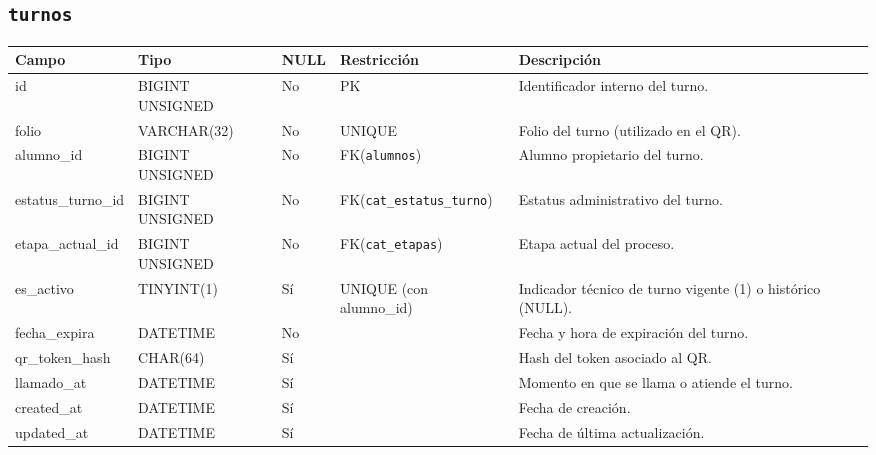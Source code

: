 \documentclass[12pt,a4paper]{article}
\begin{document}
\subsection{\texttt{turnos}}
\begin{longtable}{L{3.2cm} L{3.2cm} C{1.2cm} L{2.8cm} L{5.0cm}}
\toprule
\textbf{Campo} & \textbf{Tipo} & \textbf{NULL} & \textbf{Restricción} & \textbf{Descripción} \\
\midrule
\endhead
id & BIGINT UNSIGNED & No & PK & Identificador interno del turno. \\
folio & VARCHAR(32) & No & UNIQUE & Folio del turno (utilizado en el QR). \\
alumno\_id & BIGINT UNSIGNED & No & FK(\texttt{alumnos}) & Alumno propietario del turno. \\
estatus\_turno\_id & BIGINT UNSIGNED & No & FK(\texttt{cat\_estatus\_turno}) & Estatus administrativo del turno. \\
etapa\_actual\_id & BIGINT UNSIGNED & No & FK(\texttt{cat\_etapas}) & Etapa actual del proceso. \\
es\_activo & TINYINT(1) & Sí & UNIQUE (con alumno\_id) & Indicador técnico de turno vigente (1) o histórico (NULL). \\
fecha\_expira & DATETIME & No &  & Fecha y hora de expiración del turno. \\
qr\_token\_hash & CHAR(64) & Sí &  & Hash del token asociado al QR. \\
llamado\_at & DATETIME & Sí &  & Momento en que se llama o atiende el turno. \\
created\_at & DATETIME & Sí &  & Fecha de creación. \\
updated\_at & DATETIME & Sí &  & Fecha de última actualización. \\
\bottomrule
\end{longtable}

\end{document}
